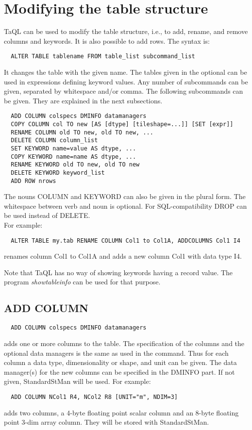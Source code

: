 \section{\label{TAQL:ALTERTABLE}Modifying the table structure}
TaQL can be used to modify the table structure, i.e., to add, rename,
and remove columns and keywords. It is also possible to add rows.
The syntax is:
\begin{verbatim}
  ALTER TABLE tablename FROM table_list subcommand_list
\end{verbatim}
It changes the table with the given name. The tables given in the 
optional 
can be used in expressions defining keyword values.
Any number of subcommands can be given, separated by whitespace and/or 
comma.
The following subcommands can be given. They are explained in
the next subsections.
\begin{verbatim}
  ADD COLUMN colspecs DMINFO datamanagers
  COPY COLUMN col TO new [AS [dtype] [tileshape=...]] [SET [expr]]
  RENAME COLUMN old TO new, old TO new, ...
  DELETE COLUMN column_list
  SET KEYWORD name=value AS dtype, ...
  COPY KEYWORD name=name AS dtype, ...
  RENAME KEYWORD old TO new, old TO new
  DELETE KEYWORD keyword_list
  ADD ROW nrows
\end{verbatim}
The nouns COLUMN and KEYWORD can also be given in the plural form. The
whitespace between verb and 
noun is optional. For SQL-compatibility DROP can be used instead of DELETE.
\\For example:
\begin{verbatim}
  ALTER TABLE my.tab RENAME COLUMN Col1 to Col1A, ADDCOLUMNS Col1 I4
\end{verbatim}
renames column Col1 to Col1A and adds a new column Col1 with data type I4.

Note that TaQL has no way of showing keywords having a record value.
The program {\em showtableinfo} can be used for that purpose.

\subsection{ADD COLUMN}
\begin{verbatim}
  ADD COLUMN colspecs DMINFO datamanagers
\end{verbatim}
adds one or more columns to the table.
The specification of the columns and the optional data managers is the
same as used in the
 command. Thus for each column
a data type, dimensionality or shape, and unit  can be given.
The data manager(s) for the new columns can be specified in the DMINFO
part. If not given, StandardStMan will be used.
For example:
\begin{verbatim}
  ADD COLUMN NCol1 R4, NCol2 R8 [UNIT="m", NDIM=3]
\end{verbatim}
adds two columns, a 4-byte floating point scalar column and an 8-byte
floating point 3-dim array column. They will be stored with StandardStMan.

